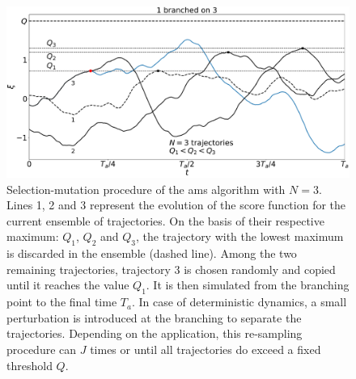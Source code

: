 \documentclass{jfm}
\newcommand{\EL}[1]{{\color{myred}{#1}}}
\begin{document}
\begin{figure}
  \centering
  \includegraphics[width=\linewidth]{illustr_AMS/illustr_AMS}
  \caption{\label{fig:illustr_AMS} Selection-mutation procedure of the \ac{ams} algorithm with $N=3$. Lines 1, 2 and 3 represent the evolution of the score function for the current ensemble of trajectories. On the basis of their respective maximum: $Q_1$, $Q_2$ and $Q_3$, the trajectory with the lowest maximum is discarded in the ensemble (dashed line). Among the two remaining trajectories, trajectory 3 is chosen randomly and copied until it reaches the value $Q_1$. It is then simulated from the branching point to the final time $T_a$. In case of deterministic dynamics, a small perturbation is introduced at the branching to separate the trajectories. Depending on the application, this re-sampling procedure can \EL{be iterated} $J$ times or until all trajectories do exceed a fixed threshold $Q$.}
\end{figure}
\end{document}
